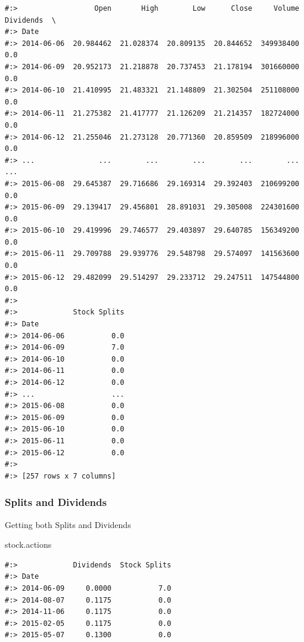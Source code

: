 \documentclass[
]{book}
\newenvironment{Shaded}{\begin{snugshade}}{\end{snugshade}}
\newcommand{\NormalTok}[1]{#1}
\begin{document}
\begin{verbatim}
#:>                  Open       High        Low      Close     Volume  Dividends  \
#:> Date                                                                           
#:> 2014-06-06  20.984462  21.028374  20.809135  20.844652  349938400        0.0   
#:> 2014-06-09  20.952173  21.218878  20.737453  21.178194  301660000        0.0   
#:> 2014-06-10  21.410995  21.483321  21.148809  21.302504  251108000        0.0   
#:> 2014-06-11  21.275382  21.417777  21.126209  21.214357  182724000        0.0   
#:> 2014-06-12  21.255046  21.273128  20.771360  20.859509  218996000        0.0   
#:> ...               ...        ...        ...        ...        ...        ...   
#:> 2015-06-08  29.645387  29.716686  29.169314  29.392403  210699200        0.0   
#:> 2015-06-09  29.139417  29.456801  28.891031  29.305008  224301600        0.0   
#:> 2015-06-10  29.419996  29.746577  29.403897  29.640785  156349200        0.0   
#:> 2015-06-11  29.709788  29.939776  29.548798  29.574097  141563600        0.0   
#:> 2015-06-12  29.482099  29.514297  29.233712  29.247511  147544800        0.0   
#:> 
#:>             Stock Splits  
#:> Date                      
#:> 2014-06-06           0.0  
#:> 2014-06-09           7.0  
#:> 2014-06-10           0.0  
#:> 2014-06-11           0.0  
#:> 2014-06-12           0.0  
#:> ...                  ...  
#:> 2015-06-08           0.0  
#:> 2015-06-09           0.0  
#:> 2015-06-10           0.0  
#:> 2015-06-11           0.0  
#:> 2015-06-12           0.0  
#:> 
#:> [257 rows x 7 columns]
\end{verbatim}

\hypertarget{splits-and-dividends-1}{%
\subsubsection{Splits and Dividends}\label{splits-and-dividends-1}}

Getting both Splits and Dividends

\begin{Shaded}
\begin{Highlighting}[]
\NormalTok{stock.actions}
\end{Highlighting}
\end{Shaded}

\begin{verbatim}
#:>             Dividends  Stock Splits
#:> Date                               
#:> 2014-06-09     0.0000           7.0
#:> 2014-08-07     0.1175           0.0
#:> 2014-11-06     0.1175           0.0
#:> 2015-02-05     0.1175           0.0
#:> 2015-05-07     0.1300           0.0
\end{verbatim}
\end{document}
